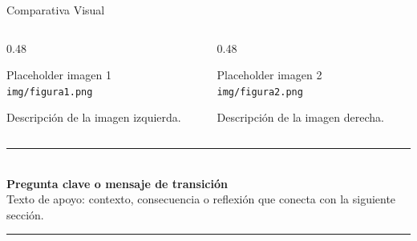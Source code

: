 \begin{frame}{Comparativa Visual}
  \begin{columns}[T]
    \begin{column}{0.48\textwidth}
      \centering
      \begin{alertblock}{Placeholder imagen 1}
        \texttt{img/figura1.png}
      \end{alertblock}
      {\small Descripción de la imagen izquierda.}\\[0.05cm]
    \end{column}
    \begin{column}{0.48\textwidth}
      \centering
      \begin{alertblock}{Placeholder imagen 2}
        \texttt{img/figura2.png}
      \end{alertblock}
      {\small Descripción de la imagen derecha.}\\[0.05cm]
    \end{column}
  \end{columns}
\end{frame}

\begin{frame}[plain]
  \hspace{0.8cm}%
  \begin{minipage}{0.88\textwidth}
    \vspace{2.2cm}
    {\color{SotmTerracota}\rule{0.5\textwidth}{1.2pt}}\\[0.5cm]
    {\large\bfseries\color{SotmVerde}
      Pregunta clave o mensaje de transición}\\[0.6cm]
    {\normalsize\color{black}
      Texto de apoyo: contexto, consecuencia o reflexión que conecta
      con la siguiente sección.}\\[0.5cm]
    {\color{SotmTerracota}\rule{0.3\textwidth}{0.8pt}}
    \vfill
  \end{minipage}
\end{frame}

